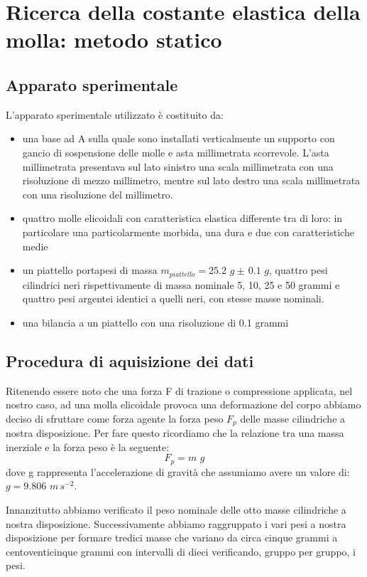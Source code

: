 \section{Ricerca della costante elastica della molla: metodo statico}

\subsection{Apparato sperimentale}
L'apparato sperimentale utilizzato è costituito da:
	\begin{itemize}
		\item{una base ad A sulla quale sono installati verticalmente un supporto con gancio di sospensione delle molle e asta millimetrata scorrevole. L'asta millimetrata presentava sul lato sinistro una scala millimetrata con una risoluzione di mezzo millimetro, mentre sul lato destro una scala millimetrata con una risoluzione del millimetro.}
		\item{quattro molle elicoidali con caratteristica elastica differente tra di loro: in particolare una particolarmente morbida, una dura e due con caratteristiche medie}
		\item{un piattello portapesi di massa $m_{piattello} = 25.2\,\,g \pm\, 0.1\,\,g$, quattro pesi cilindrici neri rispettivamente di massa nominale 5, 10, 25 e 50 grammi e quattro pesi argentei identici a quelli neri, con stesse masse nominali.}
		\item{una bilancia a un piattello con una risoluzione di 0.1 grammi}
	\end{itemize}

\subsection{Procedura di aquisizione dei dati}
Ritenendo essere noto che una forza F di trazione o compressione applicata, nel nostro caso, ad una molla elicoidale provoca una deformazione del corpo abbiamo deciso di sfruttare come forza agente la forza peso $F_{p}$ delle masse cilindriche a nostra disposizione. Per fare questo ricordiamo che la relazione tra una massa inerziale e la forza peso è la seguente:
\begin{equation}
	F_{p} = m\,\,g
\end{equation}
dove g rappresenta l'accelerazione di gravità che assumiamo avere un valore di: $g = 9.806\,\,m\,s^{-2}$.

Innanzitutto abbiamo verificato il peso nominale delle otto masse cilindriche a nostra disposizione. Successivamente abbiamo raggruppato i vari pesi a nostra disposizione per formare tredici masse che variano da circa cinque grammi a centoventicinque grammi con intervalli di dieci verificando, gruppo per gruppo, i pesi.

